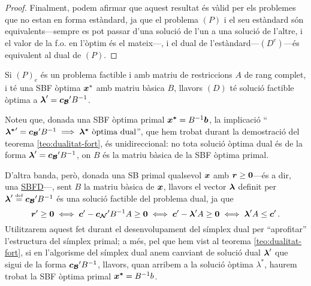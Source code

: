 \begin{teo}
\begin{proof}
    	Finalment, podem afirmar que aquest resultat és vàlid per els problemes que no estan en forma estàndard, ja que el problema $(P)$ i el seu estàndard són equivalents---sempre es pot passar d'una solució de l'un a una solució de l'altre, i el valor de la f.o. en l'òptim és el mateix---, i el dual de l'estàndard---$(D^e)$---és equivalent al dual de $(P)$.
    \end{proof}
\end{teo}

\begin{col}
    Si $\left(P\right)_e$ és un problema factible i amb matriu de restriccions $A$ de rang complet, i té una SBF òptima $\boldsymbol{x}^\ast$ amb matriu bàsica $B$, llavors $\left(D\right)$ té solució factible òptima a $\boldsymbol{\lambda}' = \boldsymbol{c_{\mathcal{B}}}'B^{-1}$.
\end{col}

Noteu que, donada una SBF òptima primal $\boldsymbol{x^\ast} = B^{-1}\boldsymbol{b}$, la implicació ``$\boldsymbol{\lambda^\ast}'= \boldsymbol{c_{\mathcal{B}}}'B^{-1} \implies \boldsymbol{\lambda^\ast} \text{ òptima dual}$'', que hem trobat durant la demostració del teorema \ref{teo:dualitat-fort}, és unidireccional: no tota solució òptima dual és de la forma $\boldsymbol{\lambda}' = \boldsymbol{c_{\mathcal{B}}}'B^{-1}$, on $B$ és la matriu bàsica de la SBF òptima primal. 

D'altra banda, però, donada una SB primal qualsevol $\boldsymbol{x}$ amb $\boldsymbol{r} \ge \boldsymbol{0}$---és a dir, una \hyperref[defi:SBFD]{SBFD}---, sent $B$ la matriu bàsica de $\boldsymbol{x}$, llavors el vector $\boldsymbol{\lambda}$ definit per $\boldsymbol{\lambda}' \stackrel{\text{\tiny def}}{=} \boldsymbol{c_{\mathcal{B}}}'B^{-1}$ és una solució factible del problema dual, ja que
\[
	\boldsymbol{r}'\ge \boldsymbol{0} \iff \boldsymbol{c}' - \boldsymbol{c_{\mathcal{N}}}'B^{-1}A \ge \boldsymbol{0} \iff \boldsymbol{c}' - \boldsymbol{\lambda}'A \ge \boldsymbol{0}  \iff \boldsymbol{\lambda}'A \le \boldsymbol{c}'\,.
\]
 Utilitzarem aquest fet durant el desenvolupament del símplex dual per ``aprofitar'' l'estructura del símplex primal; a més, pel que hem vist al teorema \ref{teo:dualitat-fort}, si en l'algorisme del símplex dual anem canviant de solució dual $\boldsymbol{\lambda}'$ que sigui de la forma $\boldsymbol{c_{\mathcal{B}}}' B^{-1}$, llavors, quan arribem a la solució òptima $\lambda^\ast$, haurem trobat la SBF òptima primal $\boldsymbol{x^\ast} = B^{-1}b$.

